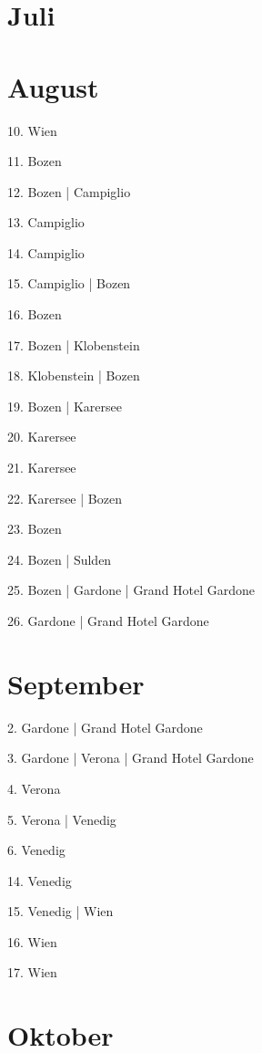 \documentclass[twoside=false,titlepage=false,open=any, parskip=never, fontsize=10pt, headings=small, chapterprefix=false, appendixprefix=false, DIV=15]{scrbook}
\begin{document}
\begin{multicols}{3}
            \section*{Juli}
            \section*{August}
            10. Wien\par
            11. Bozen\par
            12. Bozen | Campiglio\par
            13. Campiglio\par
            14. Campiglio\par
            15. Campiglio | Bozen\par
            16. Bozen\par
            17. Bozen | Klobenstein\par
            18. Klobenstein | Bozen\par
            19. Bozen | Karersee\par
            20. Karersee\par
            21. Karersee\par
            22. Karersee | Bozen\par
            23. Bozen\par
            24. Bozen | Sulden\par
            25. Bozen | Gardone | Grand Hotel Gardone\par
            26. Gardone | Grand Hotel Gardone\par
            \section*{September}
            2. Gardone | Grand Hotel Gardone\par
            3. Gardone | Verona | Grand Hotel Gardone\par
            4. Verona\par
            5. Verona | Venedig\par
            6. Venedig\par
            14. Venedig\par
            15. Venedig | Wien\par
            16. Wien\par
            17. Wien\par
            \section*{Oktober}

\end{multicols}
\end{document}
